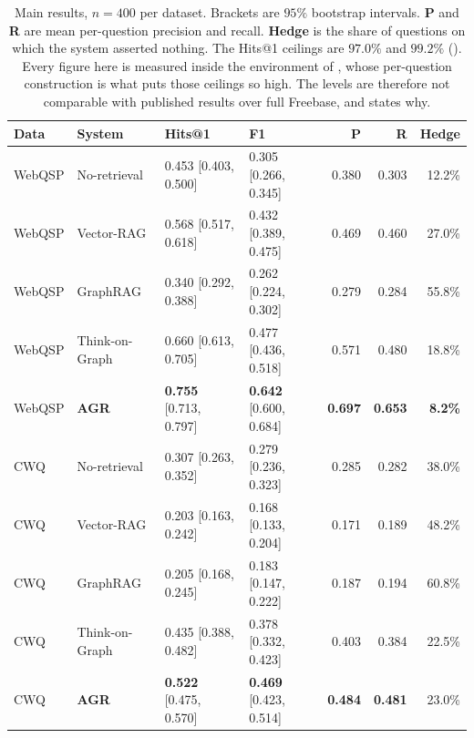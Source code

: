 \begin{table}[!tb]
  \begin{center}
    \caption[Main results on both test sets]{Main results, $n = 400$ per
    dataset. Brackets are $95\%$ bootstrap intervals. \textbf{P} and \textbf{R}
    are mean per-question precision and recall. \textbf{Hedge} is the share of
    questions on which the system asserted nothing. The Hits@1 ceilings are
    $97.0\%$ and $99.2\%$ (). Every figure here is measured
    inside the environment of , whose per-question
    construction is what puts those ceilings so high. The levels are therefore
    not comparable with published results over full Freebase, and
     states why.}
    \label{tab:main}
    \small
    \setlength{\tabcolsep}{5pt}
    \begin{tabular}{|l|l|l|l|r|r|r|}
      \hline
      \textbf{Data} & \textbf{System} & \textbf{Hits@1} & \textbf{F1} &
      \textbf{P} & \textbf{R} & \textbf{Hedge} \\
      \hline
      WebQSP & No-retrieval  & 0.453 [0.403, 0.500] & 0.305 [0.266, 0.345] &
        0.380 & 0.303 & 12.2\% \\
      WebQSP & Vector-RAG    & 0.568 [0.517, 0.618] & 0.432 [0.389, 0.475] &
        0.469 & 0.460 & 27.0\% \\
      WebQSP & GraphRAG      & 0.340 [0.292, 0.388] & 0.262 [0.224, 0.302] &
        0.279 & 0.284 & 55.8\% \\
      WebQSP & Think-on-Graph & 0.660 [0.613, 0.705] & 0.477 [0.436, 0.518] &
        0.571 & 0.480 & 18.8\% \\
      WebQSP & \textbf{AGR}  & \textbf{0.755} [0.713, 0.797] &
        \textbf{0.642} [0.600, 0.684] & \textbf{0.697} & \textbf{0.653} &
        \textbf{8.2\%} \\
      \hline
      CWQ & No-retrieval  & 0.307 [0.263, 0.352] & 0.279 [0.236, 0.323] &
        0.285 & 0.282 & 38.0\% \\
      CWQ & Vector-RAG    & 0.203 [0.163, 0.242] & 0.168 [0.133, 0.204] &
        0.171 & 0.189 & 48.2\% \\
      CWQ & GraphRAG      & 0.205 [0.168, 0.245] & 0.183 [0.147, 0.222] &
        0.187 & 0.194 & 60.8\% \\
      CWQ & Think-on-Graph & 0.435 [0.388, 0.482] & 0.378 [0.332, 0.423] &
        0.403 & 0.384 & 22.5\% \\
      CWQ & \textbf{AGR}  & \textbf{0.522} [0.475, 0.570] &
        \textbf{0.469} [0.423, 0.514] & \textbf{0.484} & \textbf{0.481} &
        23.0\% \\
      \hline
    \end{tabular}
  \end{center}
\end{table}

